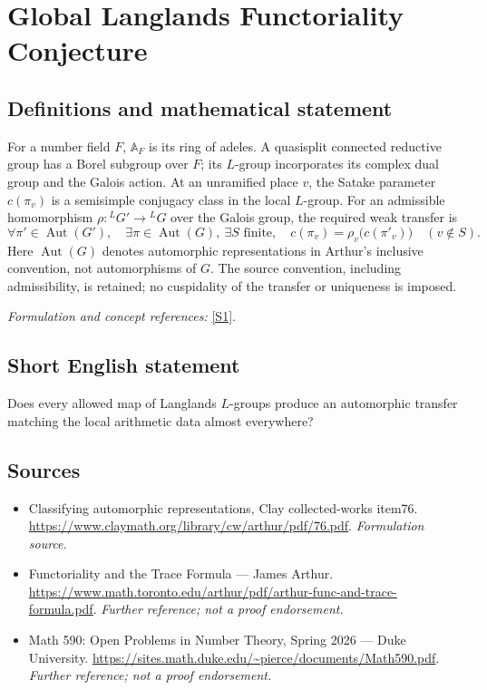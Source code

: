 \documentclass[11pt]{article}
\begin{document}
\section*{\texorpdfstring{Global Langlands Functoriality Conjecture}{Global Langlands Functoriality Conjecture}}\label{30006675}
\subsection{Definitions and mathematical statement}
For a number field $F$, ${\mathbb{A}}_F$ is its ring of adeles. A quasisplit connected reductive group has a Borel subgroup over $F$; its $L$-group incorporates its complex dual group and the Galois action. At an unramified place $v$, the Satake parameter $c(\pi_v)$ is a semisimple conjugacy class in the local $L$-group. For an admissible homomorphism $\rho:{}^LG'\to{}^LG$ over the Galois group, the required weak transfer is
\[
 \forall\pi'\in\operatorname{Aut}(G'),\quad \exists\pi\in\operatorname{Aut}(G),\ \exists S\text{ finite},\quad
 c(\pi_v)=\rho_v\bigl(c(\pi'_v)\bigr)\quad(v\notin S).
\]
Here $\operatorname{Aut}(G)$ denotes automorphic representations in Arthur's inclusive convention, not automorphisms of $G$. The source convention, including admissibility, is retained; no cuspidality of the transfer or uniqueness is imposed.
\par\smallskip\textit{Formulation and concept references:} \href{https://www.claymath.org/library/cw/arthur/pdf/76.pdf}{[S1]}.

\subsection{Short English statement}
Does every allowed map of Langlands $L$-groups produce an automorphic transfer matching the local arithmetic data almost everywhere?
\subsection{Sources}
\begin{itemize}
\item[S1]Classifying automorphic representations, Clay collected-works item76.
\url{https://www.claymath.org/library/cw/arthur/pdf/76.pdf}.
\textit{Formulation source.}
\item[S2]Functoriality and the Trace Formula — James Arthur.
\url{https://www.math.toronto.edu/arthur/pdf/arthur-func-and-trace-formula.pdf}.
\textit{Further reference; not a proof endorsement.}
\item[S3]Math 590: Open Problems in Number Theory, Spring 2026 — Duke University.
\url{https://sites.math.duke.edu/~pierce/documents/Math590.pdf}.
\textit{Further reference; not a proof endorsement.}
\end{itemize}
\end{document}
